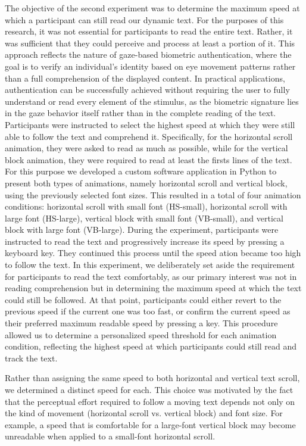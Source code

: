 \documentclass[12pt]{report}
\begin{document}
The objective of the second experiment was to determine the maximum speed at which a participant can still read our dynamic text. 
For the purposes of this research, it was not essential for participants to read the entire text. 
Rather, it was sufficient that they could perceive and process at least a portion of it. 
This approach reflects the nature of gaze-based biometric authentication, where the goal is to verify an individual's identity based on eye movement patterns rather than a full comprehension of the displayed content. 
In practical applications, authentication can be successfully achieved without requiring the user to fully understand or read every element of the stimulus, as the biometric signature lies in the gaze behavior itself rather than in the complete reading of the text.
Participants were instructed to select the highest speed at which they were still able to follow the text and comprehend it.
Specifically, for the horizontal scroll animation, they were asked to read as much as possible, while for the vertical block animation, they were required to read at least the firsts lines of the text.
For this purpose we developed a custom software application in Python to present both types of animations, namely horizontal scroll and vertical block, using the previously selected font sizes.
This resulted in a total of four animation conditions: horizontal scroll with small font (HS-small), horizontal scroll with large font (HS-large), vertical block with small font (VB-small), and vertical block with large font (VB-large).
During the experiment, participants were instructed to read the text and progressively increase its speed by pressing a keyboard key. 
They continued this process until the speed ation became too high to follow the text.
In this experiment, we deliberately set aside the requirement for participants to read the text comfortably, as our primary interest was not in reading comprehension but in determining the maximum speed at which the text could still be followed.
At that point, participants could either revert to the previous speed if the current one was too fast, or confirm the current speed as their preferred maximum readable speed by pressing a key.
This procedure allowed us to determine a personalized speed threshold for each animation condition, reflecting the highest speed at which participants could still read and track the text. 

Rather than assigning the same speed to both horizontal and vertical text scroll, we determined a distinct speed for each. 
This choice was motivated by the fact that the perceptual effort required to follow a moving text depends not only on the kind of movement (horizontal scroll vs. vertical block) and font size. 
For example, a speed that is comfortable for a large-font vertical block may become unreadable when applied to a small-font horizontal scroll.
\end{document}

